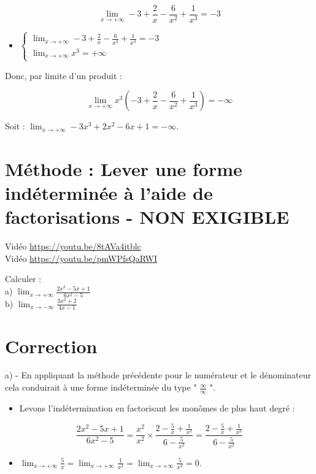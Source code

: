 \documentclass[10pt]{article}
\begin{document}
$$
\lim _{x \rightarrow+\infty}-3+\frac{2}{x}-\frac{6}{x^{2}}+\frac{1}{x^{3}}=-3
$$

\begin{itemize}
  \item $\left\{\begin{array}{l}\lim _{x \rightarrow+\infty}-3+\frac{2}{x}-\frac{6}{x^{2}}+\frac{1}{x^{3}}=-3 \\ \lim _{x \rightarrow+\infty} x^{3}=+\infty\end{array}\right.$
\end{itemize}

Donc, par limite d'un produit :

$$
\lim _{x \rightarrow+\infty} x^{3}\left(-3+\frac{2}{x}-\frac{6}{x^{2}}+\frac{1}{x^{3}}\right)=-\infty
$$

Soit : $\lim _{x \rightarrow+\infty}-3 x^{3}+2 x^{2}-6 x+1=-\infty$.

\section*{Méthode : Lever une forme indéterminée à l'aide de factorisations - NON EXIGIBLE}
Vidéo \href{https://youtu.be/8tAVa4itblc}{https://youtu.be/8tAVa4itblc}\\
Vidéo \href{https://youtu.be/pmWPfsQaRWI}{https://youtu.be/pmWPfsQaRWI}

Calculer :\\
a) $\lim _{x \rightarrow+\infty} \frac{2 x^{2}-5 x+1}{6 x^{2}-5}$\\
b) $\lim _{x \rightarrow-\infty} \frac{3 x^{2}+2}{4 x-1}$

\section*{Correction}
a) - En appliquant la méthode précédente pour le numérateur et le dénominateur cela conduirait à une forme indéterminée du type " $\frac{\infty}{\infty}$ ".

\begin{itemize}
  \item Levons l'indétermination en factorisant les monômes de plus haut degré :
\end{itemize}

$$
\frac{2 x^{2}-5 x+1}{6 x^{2}-5}=\frac{x^{2}}{x^{2}} \times \frac{2-\frac{5}{x}+\frac{1}{x^{2}}}{6-\frac{5}{x^{2}}}=\frac{2-\frac{5}{x}+\frac{1}{x^{2}}}{6-\frac{5}{x^{2}}}
$$

\begin{itemize}
  \item $\lim _{x \rightarrow+\infty} \frac{5}{x}=\lim _{x \rightarrow+\infty} \frac{1}{x^{2}}=\lim _{x \rightarrow+\infty} \frac{5}{x^{2}}=0$.
\end{itemize}
\end{document}
